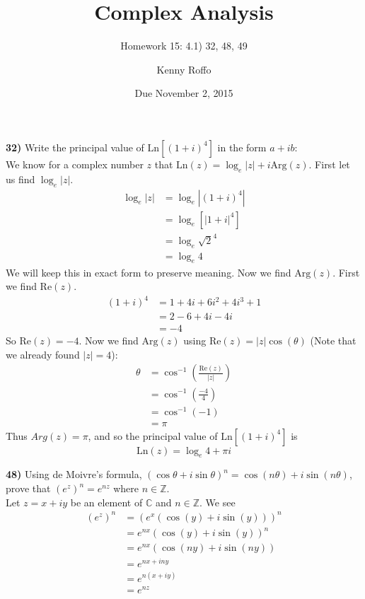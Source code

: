\documentclass{scrartcl}
\title{Complex Analysis}
\subtitle{Homework 15: 4.1) 32, 48, 49}
\author{Kenny Roffo}
\date{Due November 2, 2015}
\newcommand{\Ln}{\text{Ln}}
\newcommand{\Arg}{\text{Arg}}
\newcommand{\Rp}{\text{Re}}
\begin{document}
\maketitle

\textbf{32)} Write the principal value of $\Ln\left[(1+i)^4\right]$ in the form $a+ib$:\\

We know for a complex number $z$ that $\Ln(z) = \log_e|z| + i\Arg(z)$. First let us find $\log_e|z|$.
\begin{align*}
  \log_e|z| &= \log_e\left|(1+i)^4\right|\\
  &= \log_e\left[|1+i|^4\right]\\
  &= \log_e\sqrt{2}^4\\
  &= \log_e4
\end{align*}
We will keep this in exact form to preserve meaning. Now we find $\Arg(z)$. First we find $\Rp(z)$.
\begin{align*}
  (1+i)^4 &= 1 + 4i + 6i^2 + 4i^3 + 1\\
  &= 2 - 6 + 4i - 4i\\
  &= -4
\end{align*}
So $\Rp(z) = -4$. Now we find $\Arg(z)$ using $\Rp(z) = |z|\cos(\theta)$ (Note that we already found $|z| = 4$):
\begin{align*}
  \theta &= \cos^{-1}\left(\frac{\Rp(z)}{|z|}\right)\\
  &= \cos^{-1}\left(\frac{-4}{4}\right)\\
  &= \cos^{-1}\left(-1\right)\\
  &= \pi
\end{align*}
Thus $Arg(z) = \pi$, and so the principal value of $\Ln\left[(1+i)^4\right]$ is $$\Ln(z) = \log_e4 + \pi i$$\pagebreak

\textbf{48)} Using de Moivre's formula, $(\cos \theta + i\sin \theta)^n = \cos(n\theta) + i\sin(n\theta)$, prove that $\left(e^z\right)^n = e^{nz}$ where $n \in \mathbb{Z}$.\\

Let $z = x + iy$ be an element of $\mathbb{C}$ and $n \in \mathbb{Z}$. We see
\begin{align*}
  \left(e^z\right)^n &= \left(e^x\left(\cos(y) + i\sin(y)\right)\right)^n\\
  &= e^{nx}\left(\cos(y) + i\sin(y)\right)^n\\
  &= e^{nx}\left(\cos(ny) + i\sin(ny)\right)\\
  &= e^{nx + iny}\\
  &= e^{n(x+iy)}\\
  &= e^{nz}
\end{align*}
\end{document}
